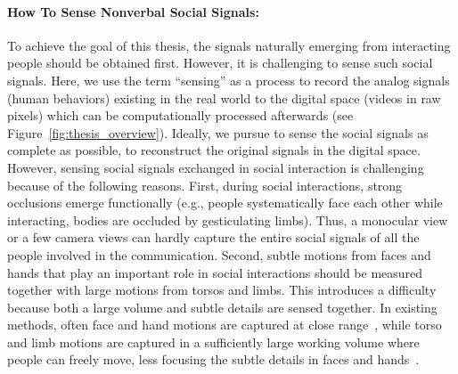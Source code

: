 \paragraph{How To Sense Nonverbal Social Signals:}
To achieve the goal of this thesis, the signals naturally emerging from interacting people should be obtained first. However, it is challenging to sense such social signals. Here, we use the term ``sensing'' as a process to record the analog signals (human behaviors) existing in the real world to the digital space (videos in raw pixels) which can be computationally processed afterwards (see Figure~\ref{fig:thesis_overview}). Ideally, we pursue to sense the social signals as complete as possible, to reconstruct the original signals in the digital space. However, sensing social signals exchanged in social interaction is challenging because of the following reasons. First, during social interactions, strong occlusions emerge functionally (e.g., people systematically face each other while interacting, bodies are occluded by gesticulating limbs). Thus, a monocular view or a few camera views can hardly capture the entire social signals of all the people involved in the communication. Second, subtle motions from faces and hands that play an important role in social interactions should be measured together with large motions from torsos and limbs. This introduces a difficulty because both a large volume and subtle details are sensed together. In existing methods, often face and hand motions are captured at close range~\cite{beeler2010high,ghosh2011multiview, Beeler2011, bradley2010high, valgaerts2012lightweight, Oikonomidis-12, Tompson-14a, Sridha-15, Tzionas-16}, while torso and limb motions are captured in a sufficiently large working volume where people can freely move, less focusing the subtle details in faces and hands~\cite{de2008performance, Gall-09, Stoll-11, Elhayek-15}. %
 

